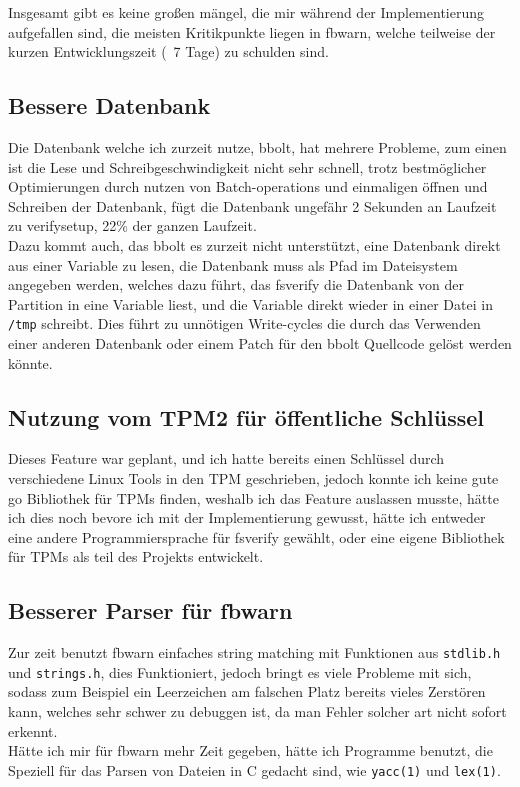 Insgesamt gibt es keine großen mängel, die mir während der Implementierung aufgefallen sind, die meisten Kritikpunkte liegen in fbwarn, welche teilweise der kurzen Entwicklungszeit (~7 Tage) zu schulden sind. 

\subsection{Bessere Datenbank}
Die Datenbank welche ich zurzeit nutze, bbolt, hat mehrere Probleme, zum einen ist die Lese und Schreibgeschwindigkeit nicht sehr schnell, trotz bestmöglicher Optimierungen durch nutzen von Batch-operations und einmaligen öffnen und Schreiben der Datenbank, fügt die Datenbank ungefähr 2 Sekunden an Laufzeit zu verifysetup, 22\% der ganzen Laufzeit.\\
Dazu kommt auch, das bbolt es zurzeit nicht unterstützt, eine Datenbank direkt aus einer Variable zu lesen, die Datenbank muss als Pfad im Dateisystem angegeben werden, welches dazu führt, das fsverify die Datenbank von der Partition in eine Variable liest, und die Variable direkt wieder in einer Datei in \texttt{/tmp} schreibt. Dies führt zu unnötigen Write-cycles die durch das Verwenden einer anderen Datenbank oder einem Patch für den bbolt Quellcode gelöst werden könnte.

\subsection{Nutzung vom TPM2 für öffentliche Schlüssel}
Dieses Feature war geplant, und ich hatte bereits einen Schlüssel durch verschiedene Linux Tools in den TPM geschrieben, jedoch konnte ich keine gute go Bibliothek für TPMs finden, weshalb ich das Feature auslassen musste, hätte ich dies noch bevore ich mit der Implementierung gewusst, hätte ich entweder eine andere Programmiersprache für fsverify gewählt, oder eine eigene Bibliothek für TPMs als teil des Projekts entwickelt.

\subsection{Besserer Parser für fbwarn}
Zur zeit benutzt fbwarn einfaches string matching mit Funktionen aus \texttt{stdlib.h} und \texttt{strings.h}, dies Funktioniert, jedoch bringt es viele Probleme mit sich, sodass zum Beispiel ein Leerzeichen am falschen Platz bereits vieles Zerstören kann, welches sehr schwer zu debuggen ist, da man Fehler solcher art nicht sofort erkennt.\\
Hätte ich mir für fbwarn mehr Zeit gegeben, hätte ich Programme benutzt, die Speziell für das Parsen von Dateien in C gedacht sind, wie \texttt{yacc(1)} und \texttt{lex(1)}.

